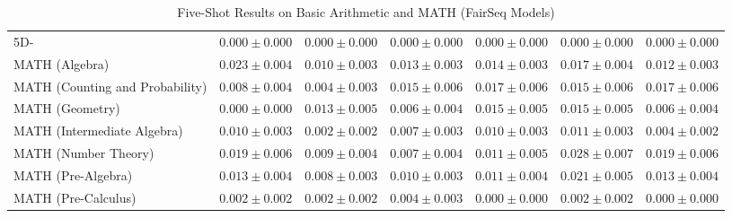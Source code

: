 \documentclass[11pt]{article}
\begin{document}
{\begin{landscape}
\begin{table}
\begin{tabular}{l c c c c c c }
5D- & $0.000 \pm 0.000$ & $0.000 \pm 0.000$ & $0.000 \pm 0.000$ & $0.000 \pm 0.000$ & $0.000 \pm 0.000$ & $0.000 \pm 0.000$ \\ 
MATH (Algebra) & $0.023 \pm 0.004$ & $0.010 \pm 0.003$ & $0.013 \pm 0.003$ & $0.014 \pm 0.003$ & $0.017 \pm 0.004$ & $0.012 \pm 0.003$ \\ 
MATH (Counting and Probability) & $0.008 \pm 0.004$ & $0.004 \pm 0.003$ & $0.015 \pm 0.006$ & $0.017 \pm 0.006$ & $0.015 \pm 0.006$ & $0.017 \pm 0.006$ \\ 
MATH (Geometry) & $0.000 \pm 0.000$ & $0.013 \pm 0.005$ & $0.006 \pm 0.004$ & $0.015 \pm 0.005$ & $0.015 \pm 0.005$ & $0.006 \pm 0.004$ \\ 
MATH (Intermediate Algebra) & $0.010 \pm 0.003$ & $0.002 \pm 0.002$ & $0.007 \pm 0.003$ & $0.010 \pm 0.003$ & $0.011 \pm 0.003$ & $0.004 \pm 0.002$ \\ 
MATH (Number Theory) & $0.019 \pm 0.006$ & $0.009 \pm 0.004$ & $0.007 \pm 0.004$ & $0.011 \pm 0.005$ & $0.028 \pm 0.007$ & $0.019 \pm 0.006$ \\ 
MATH (Pre-Algebra) & $0.013 \pm 0.004$ & $0.008 \pm 0.003$ & $0.010 \pm 0.003$ & $0.011 \pm 0.004$ & $0.021 \pm 0.005$ & $0.013 \pm 0.004$ \\ 
MATH (Pre-Calculus) & $0.002 \pm 0.002$ & $0.002 \pm 0.002$ & $0.004 \pm 0.003$ & $0.000 \pm 0.000$ & $0.002 \pm 0.002$ & $0.000 \pm 0.000$ \\ 
\bottomrule 
\end{tabular}
\caption{Five-Shot Results on Basic Arithmetic and MATH (FairSeq Models)}
\label{tab:math_fairseq_5}
\end{table}
\end{landscape}}
\end{document}
